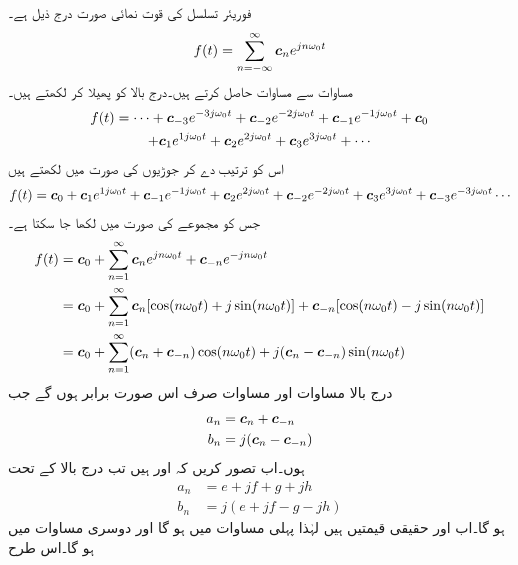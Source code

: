فوریئر تسلسل کی قوت نمائی صورت درج ذیل ہے۔
\begin{align}\label{مساوات_فوریئر_قوت_نمائی_الف}
f(t)=\sum_{n=-\infty}^{\infty} {{\boldsymbol{c}}}_ne^{jn\omega_0 t}
\end{align}
مساوات  سے مساوات  حاصل کرتے ہیں۔درج بالا کو پھیلا کر لکھتے ہیں۔
\begin{multline*}
f(t)=\cdots+{{\boldsymbol{c}}}_{-3}e^{-3j\omega_0 t}+{{\boldsymbol{c}}}_{-2}e^{-2j\omega_0 t}+{{\boldsymbol{c}}}_{-1}e^{-1j\omega_0 t}+{{\boldsymbol{c}}}_0\\
+{{\boldsymbol{c}}}_{1}e^{1j\omega_0 t}+{{\boldsymbol{c}}}_{2}e^{2j\omega_0 t}+{{\boldsymbol{c}}}_{3}e^{3j\omega_0 t}+\cdots
\end{multline*}
اس کو ترتیب دے کر جوڑیوں کی صورت میں لکھتے ہیں
\begin{multline*}
f(t)={{\boldsymbol{c}}}_0+{{\boldsymbol{c}}}_{1}e^{1j\omega_0 t}+{{\boldsymbol{c}}}_{-1}e^{-1j\omega_0 t}+{{\boldsymbol{c}}}_{2}e^{2j\omega_0 t}+{{\boldsymbol{c}}}_{-2}e^{-2j\omega_0 t}+{{\boldsymbol{c}}}_{3}e^{3j\omega_0 t}+{{\boldsymbol{c}}}_{-3}e^{-3j\omega_0 t}\cdots
\end{multline*}
جس کو مجموعے کی صورت میں لکھا جا سکتا ہے۔
\begin{gather}
\begin{aligned}
f(t)&={{\boldsymbol{c}}}_0+\sum_{n=1}^{\infty} {{\boldsymbol{c}}}_ne^{jn\omega_0 t}+{{\boldsymbol{c}}}_{-n} e^{-jn\omega_0 t}\\
&={{\boldsymbol{c}}}_0+\sum_{n=1}^{\infty} {{\boldsymbol{c}}}_n[\cos (n\omega_0 t)+j\sin(n\omega_0 t)]+{{\boldsymbol{c}}}_{-n}[\cos (n\omega_0 t)-j\sin(n\omega_0 t)]\\
&={{\boldsymbol{c}}}_0+\sum_{n=1}^{\infty}({{\boldsymbol{c}}}_n+{{\boldsymbol{c}}}_{-n})\cos(n\omega_0 t)+j({{\boldsymbol{c}}}_n-{{\boldsymbol{c}}}_{-n})\sin(n\omega_0t)
\end{aligned}
\end{gather}
درج بالا مساوات اور مساوات  صرف اس صورت برابر ہوں گے جب
\begin{gather}
\begin{aligned}\label{مساوات_فوریئر_مستقل_تعلق}
a_n&={{\boldsymbol{c}}}_n+{{\boldsymbol{c}}}_{-n}\\
b_n&=j({{\boldsymbol{c}}}_n-{{\boldsymbol{c}}}_{-n})
\end{aligned}
\end{gather}
ہوں۔اب تصور کریں کہ  اور  ہیں تب درج بالا کے تحت
\begin{align*}
a_n&=e+jf+g+jh\\
b_n&=j(e+jf-g-jh)
\end{align*}
ہو گا۔اب  اور  حقیقی قیمتیں ہیں لہٰذا پہلی مساوات میں  ہو گا اور دوسری مساوات میں  ہو گا۔اس طرح
